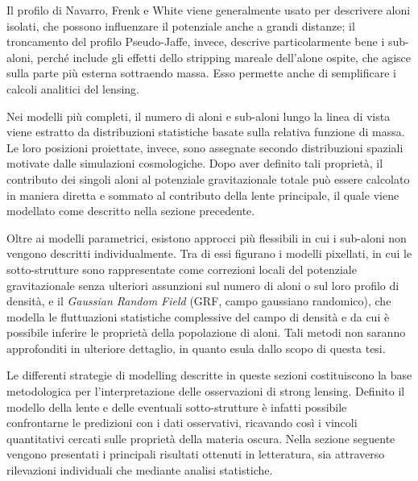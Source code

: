 Il profilo di Navarro, Frenk e White viene generalmente usato per descrivere aloni isolati, che possono influenzare il potenziale anche a grandi distanze; il troncamento del profilo Pseudo-Jaffe, invece, descrive particolarmente bene i sub-aloni, perché include gli effetti dello stripping mareale dell'alone ospite, che agisce sulla parte più esterna sottraendo massa. Esso permette anche di semplificare i calcoli analitici del lensing. 

Nei modelli più completi, il numero di aloni e sub-aloni lungo la linea di vista viene estratto da distribuzioni statistiche basate sulla relativa funzione di massa. Le loro posizioni proiettate, invece, sono assegnate secondo distribuzioni spaziali motivate dalle simulazioni cosmologiche. Dopo aver definito tali proprietà, il contributo dei singoli aloni al potenziale gravitazionale totale può essere calcolato in maniera diretta e sommato al contributo della lente principale, il quale viene modellato come descritto nella sezione precedente. 

Oltre ai modelli parametrici, esistono approcci più flessibili in cui i sub-aloni non vengono descritti individualmente. Tra di essi figurano i modelli pixellati, in cui le sotto-strutture sono rappresentate come correzioni locali del potenziale gravitazionale senza ulteriori assunzioni sul numero di aloni o sul loro profilo di densità, e il \emph{Gaussian Random Field} (GRF, campo gaussiano randomico), che modella le fluttuazioni statistiche complessive del campo di densità e da cui è possibile inferire le proprietà della popolazione di aloni. Tali metodi non saranno approfonditi in ulteriore dettaglio, in quanto esula dallo scopo di questa tesi. 

Le differenti strategie di modelling descritte in queste sezioni costituiscono la base metodologica per l'interpretazione delle osservazioni di strong lensing. Definito il modello della lente e delle eventuali sotto-strutture è infatti possibile confrontarne le predizioni con i dati osservativi, ricavando così i vincoli quantitativi cercati sulle proprietà della materia oscura. Nella sezione seguente vengono presentati i principali risultati ottenuti in letteratura, sia attraverso rilevazioni individuali che mediante analisi statistiche.

